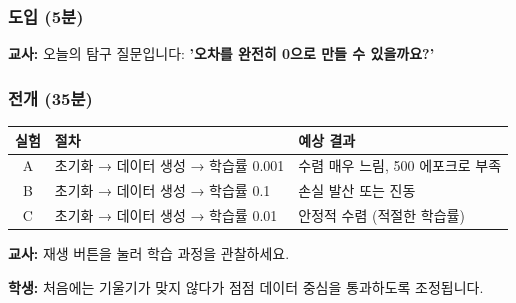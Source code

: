 \documentclass[11pt,a4paper]{article}
\begin{document}
\subsubsection{도입 (5분)}

\begin{tcolorbox}[colback=lightcyan,colframe=teal]
 \textbf{교사:} 오늘의 탐구 질문입니다: \textbf{'오차를 완전히 0으로 만들 수 있을까요?'}
\end{tcolorbox}

\subsubsection{전개 (35분)}

\begin{tcolorbox}[colback=lightgray,colframe=gray,title=\textbf{【탐구 1: 학습률 실험 - 10분】}]
\begin{center}
\begin{tabular}{|c|p{5.5cm}|p{5.5cm}|}
\hline
\textbf{실험} & \textbf{절차} & \textbf{예상 결과} \\
\hline
A & 초기화 → 데이터 생성 → 학습률 0.001 & 수렴 매우 느림, 500 에포크로 부족 \\
\hline
B & 초기화 → 데이터 생성 → 학습률 0.1 & 손실 발산 또는 진동 \\
\hline
C & 초기화 → 데이터 생성 → 학습률 0.01 & 안정적 수렴 (적절한 학습률) \\
\hline
\end{tabular}
\end{center}

\vspace{0.3cm}
 \textbf{교사:}  재생 버튼을 눌러 학습 과정을 관찰하세요.

 \textbf{학생:} 처음에는 기울기가 맞지 않다가 점점 데이터 중심을 통과하도록 조정됩니다.
\end{tcolorbox}
\end{document}
